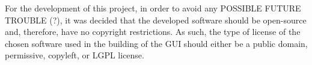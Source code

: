For the development of this project, in order to avoid any POSSIBLE FUTURE TROUBLE (?), it was decided that the developed software should be open-source and, therefore, have no  copyright restrictions. As such, the type of license of the chosen software used in the building of the GUI should either be a public domain, permissive, copyleft, or LGPL license.

